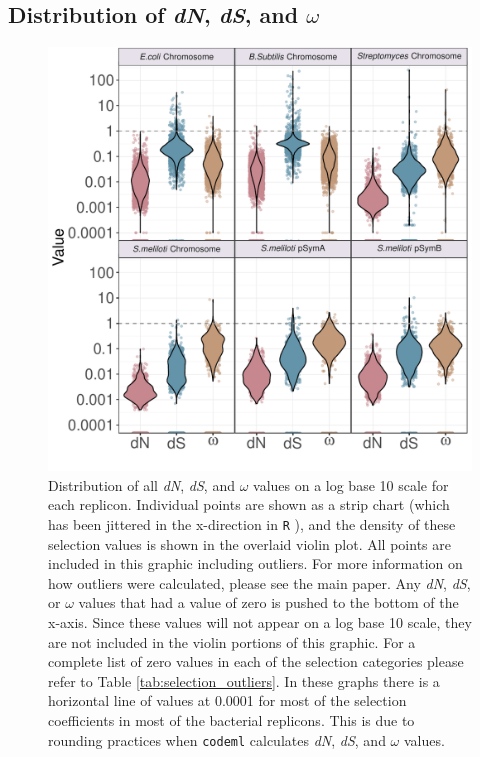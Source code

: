 \documentclass[11pt]{article}
\newcommand{\dn}{\textit{dN}\xspace}
\newcommand{\ds}{\textit{dS}\xspace}
\begin{document}
	\subsection{Distribution of \dn, \ds, and $\omega$}
	\begin{figure}
		\centering
		\includegraphics[width=\textwidth]{./figs/ALL_BAC_dN_dS_omega_violinplots_22Sep20.pdf}
		\caption{\label{fig:box_plots} Distribution of all \dn, \ds, and $\omega$ values on a log base 10 scale for each replicon. Individual points are shown as a strip chart (which has been jittered in the x-direction in \texttt{R} \citep{Wickham2019}), and the density of these selection values is shown in the overlaid violin plot. All points are included in this graphic including outliers. For more information on how outliers were calculated, please see the main paper. Any \dn, \ds, or $\omega$ values that had a value of zero is pushed to the bottom of the x-axis. Since these values will not appear on a log base 10 scale, they are not included in the violin portions of this graphic. For a complete list of zero values in each of the selection categories please refer to Table \ref{tab:selection_outliers}. In these graphs there is a horizontal line of values at 0.0001 for most of the selection coefficients in most of the bacterial replicons. This is due to rounding practices when \texttt{codeml} \citep{Yang97} calculates \dn, \ds, and $\omega$ values.}
	\end{figure}
\end{document}
